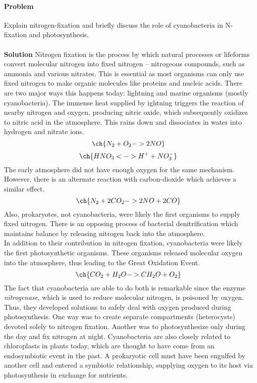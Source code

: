 \documentclass[10pt]{article}
\newcounter{prob}
\def\problem{\stepcounter{prob}\paragraph{Problem \arabic{prob}}}
\def\solution{\\\\\textbf{Solution }}
\begin{document}
        \problem Explain nitrogen-fixation and briefly discuss the role of cyanobacteria in N-fixation and photosynthesis.
        \solution Nitrogen fixation is the process by which natural processes or lifeforms convert molecular nitrogen
        into fixed nitrogen -- nitrogeous compounds, such as ammonia and various nitrates. This is essential as most organisms can only use 
        fixed nitrogen to make organic molecules like proteins and nucleic acids. There are two major ways this happens today: lightning
        and marine organisms (mostly cyanobacteria). The immense heat supplied by ightning triggers the reaction of nearby nitrogen and oxygen, producing
        nitric oxide, which subsequently oxidizes to nitric acid in the atmosphere. This rains down and dissociates in water into hydrogen
        and nitrate ions.
        \[\ch{N_2 + O_2 -> 2 NO}\]
        \[\ch{HNO_3 <-> H^+  + NO_3^-}\]
        The early atmosphere did not have enough oxygen for the same mechanism. However, there is an alternate reaction with carbon-dioxide which
        achieves a similar effect.
        \[\ch{N_2 + 2 CO_2 -> 2 NO + 2 CO}\]
        Also, prokaryotes, not cyanobacteria, were likely the first organisms to supply fixed nitrogen.
        There is an opposing process of bacterial denitrification which maintains balance by releasing nitrogen back into the atmosphere.\\

        In addition to their contribution in nitrogen fixation, cyanobacteria were likely the first photosynthetic organisms. These
        organisms released molecular oxygen into the atmosphere, thus leading to the Great Oxidation Event.
        \[\ch{CO_2 + H_2O -> CH_2O + O_2}\]
        The fact that cyanobacteria are able to do both is remarkable since the enzyme \textit{nitrogenase}, which is used to reduce molecular nitrogen,
        is poisoned by oxygen. Thus, they developed solutions to safely deal with oxygen produced during photosynthesis. One way was to create
        separate compartments (heterocysts) devoted solely to nitrogen fixation. Another was to photosynthesize only during the day and
        fix nitrogen at night. Cyanobacteria are also closely related to chloroplasts in plants today, which are thought to have come from
        an endosymbiotic event in the past. A prokaryotic cell must have been engulfed by another cell and entered a symbiotic relationship,
        supplying oxygen to its host via photosynthesis in exchange for nutrients.
\end{document}
